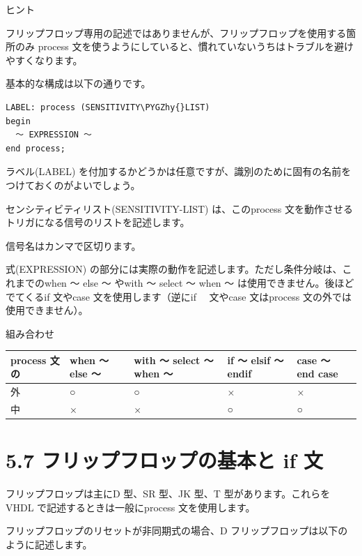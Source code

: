 \documentclass[letterpaper,10pt,dvipdfmx]{sphinxmanual}
\def\PYGZhy{\char`\-}
\begin{document}
ヒント

フリップフロップ専用の記述ではありませんが、フリップフロップを使用する箇所のみ process 文を使うようにしていると、慣れていないうちはトラブルを避けやすくなります。

基本的な構成は以下の通りです。

\begin{Verbatim}[commandchars=\\\{\}]
LABEL: process (SENSITIVITY\PYGZhy{}LIST)
begin
  ～ EXPRESSION ～
end process;
\end{Verbatim}

ラベル(LABEL) を付加するかどうかは任意ですが、識別のために固有の名前をつけておくのがよいでしょう。

センシティビティリスト(SENSITIVITY-LIST) は、このprocess 文を動作させるトリガになる信号のリストを記述します。

信号名はカンマで区切ります。

式(EXPRESSION) の部分には実際の動作を記述します。ただし条件分岐は、これまでのwhen ～ else ～ やwith ～ select ～ when ～ は使用できません。後ほどでてくるif 文やcase 文を使用します（逆にif 　文やcase 文はprocess 文の外では使用できません）。


\begin{threeparttable}
\capstart\caption{組み合わせ}\label{05_try:id31}
\begin{tabulary}{\linewidth}{|L|L|L|L|L|}
\hline
\textsf{\relax 
process 文の
} & \textsf{\relax 
when ～ else ～
} & \textsf{\relax 
with ～ select ～ when ～
} & \textsf{\relax 
if ～ elsif ～ endif
} & \textsf{\relax 
case ～ end case
}\\
\hline
外
 & 
○
 & 
○
 & 
×
 & 
×
\\
\hline
中
 & 
×
 & 
×
 & 
○
 & 
○
\\
\hline\end{tabulary}

\end{threeparttable}



\section{5.7 フリップフロップの基本と if 文}
\label{05_try:if}
フリップフロップは主にD 型、SR 型、JK 型、T 型があります。これらをVHDL で記述するときは一般にprocess 文を使用します。

フリップフロップのリセットが非同期式の場合、D フリップフロップは以下のように記述します。
\end{document}
